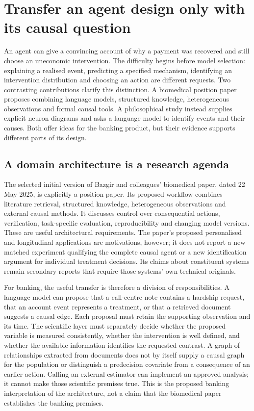 \section{Transfer an agent design only with its causal question}
\label{exec18:reasoning-transfer}
An agent can give a convincing account of why a payment was recovered and
still choose an uneconomic intervention. The difficulty begins before model
selection: explaining a realised event, predicting a specified mechanism,
identifying an intervention distribution and choosing an action are different
requests. Two contrasting contributions clarify this distinction. A biomedical
position paper proposes combining language models, structured knowledge,
heterogeneous observations and formal causal tools. A philosophical study
instead supplies explicit neuron diagrams and asks a language model to identify
events and their causes. Both offer ideas for the banking product, but their
evidence supports different parts of its design.~\citep{exec18_reasoning_biomedical,exec18_reasoning_neuron}

\subsection{A domain architecture is a research agenda}
The selected initial version of Bazgir and colleagues' biomedical paper,
dated 22 May 2025, is explicitly a position paper. Its proposed workflow
combines literature retrieval, structured knowledge, heterogeneous observations
and external causal methods. It discusses control over consequential actions,
verification, task-specific evaluation, reproducibility and changing model
versions. These are useful architectural requirements. The paper's proposed
personalised and longitudinal applications are motivations, however; it does
not report a new matched experiment qualifying the complete causal agent or a
new identification argument for individual treatment decisions. Its claims
about constituent systems remain secondary reports that require those systems'
own technical originals.~\citep{exec18_reasoning_biomedical}

For banking, the useful transfer is therefore a division of responsibilities.
A language model can propose that a call-centre note contains a hardship
request, that an account event represents a treatment, or that a retrieved
document suggests a causal edge. Each proposal must retain the supporting
observation and its time. The scientific layer must separately decide whether
the proposed variable is measured consistently, whether the intervention is
well defined, and whether the available information identifies the requested
contrast. A graph of relationships extracted from documents does not by itself
supply a causal graph for the population or distinguish a predecision
covariate from a consequence of an earlier action. Calling an external
estimator can implement an approved analysis; it cannot make those scientific
premises true. This is the proposed banking interpretation of the architecture,
not a claim that the biomedical paper establishes the banking premises.

